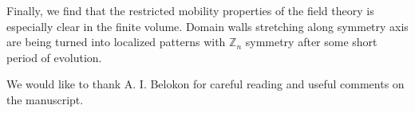 \documentclass[a4paper,12pt]{article}
\newcommand{\Z}[1]{\mathbb{Z}_{#1}}
\begin{document}
Finally, we find that the restricted mobility properties of the field theory is especially clear in the finite volume. Domain walls stretching along symmetry axis are being turned into localized patterns with $\Z{n}$ symmetry after some short period of evolution.

\acknowledgments

We would like to thank A. I. Belokon for careful reading and useful comments on the manuscript.



\end{document}

